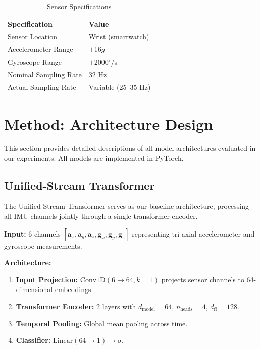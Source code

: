 \documentclass[journal,12pt]{IEEEtran}
\newcommand{\acc}{\mathbf{a}}
\newcommand{\gyro}{\mathbf{g}}
\begin{document}
\begin{table}[htbp]
\centering
\caption{Sensor Specifications}
\label{tab:sensors}
\begin{tabular}{@{}ll@{}}
\toprule
\textbf{Specification} & \textbf{Value} \\
\midrule
Sensor Location & Wrist (smartwatch) \\
Accelerometer Range & $\pm$16$g$ \\
Gyroscope Range & $\pm$2000$^\circ$/s \\
Nominal Sampling Rate & 32 Hz \\
Actual Sampling Rate & Variable (25--35 Hz) \\
\bottomrule
\end{tabular}
\end{table}


\section{Method: Architecture Design}
\label{sec:method}

This section provides detailed descriptions of all model architectures evaluated in our experiments. All models are implemented in PyTorch.

\subsection{Unified-Stream Transformer}
\label{sec:unified}

The Unified-Stream Transformer serves as our baseline architecture, processing all IMU channels jointly through a single transformer encoder.

\textbf{Input:} 6 channels $[\acc_x, \acc_y, \acc_z, \gyro_x, \gyro_y, \gyro_z]$ representing tri-axial accelerometer and gyroscope measurements.

\textbf{Architecture:}
\begin{enumerate}
    \item \textbf{Input Projection:} $\text{Conv1D}(6 \rightarrow 64, k=1)$ projects sensor channels to 64-dimensional embeddings.
    \item \textbf{Transformer Encoder:} 2 layers with $d_{\text{model}}=64$, $n_{\text{heads}}=4$, $d_{\text{ff}}=128$.
    \item \textbf{Temporal Pooling:} Global mean pooling across time.
    \item \textbf{Classifier:} $\text{Linear}(64 \rightarrow 1) \rightarrow \sigma$.
\end{enumerate}
\end{document}
